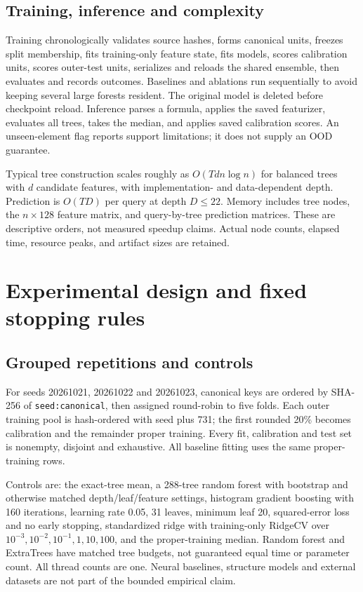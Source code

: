 \documentclass[11pt]{article}
\begin{document}
\subsection{Training, inference and complexity}
Training chronologically validates source hashes, forms canonical units, freezes split membership, fits training-only feature state, fits models, scores calibration units, scores outer-test units, serializes and reloads the shared ensemble, then evaluates and records outcomes. Baselines and ablations run sequentially to avoid keeping several large forests resident. The original model is deleted before checkpoint reload. Inference parses a formula, applies the saved featurizer, evaluates all trees, takes the median, and applies saved calibration scores. An unseen-element flag reports support limitations; it does not supply an OOD guarantee.

Typical tree construction scales roughly as $O(Tdn\log n)$ for balanced trees with $d$ candidate features, with implementation- and data-dependent depth. Prediction is $O(TD)$ per query at depth $D\leq22$. Memory includes tree nodes, the $n\times128$ feature matrix, and query-by-tree prediction matrices. These are descriptive orders, not measured speedup claims. Actual node counts, elapsed time, resource peaks, and artifact sizes are retained.

\section{Experimental design and fixed stopping rules}
\subsection{Grouped repetitions and controls}
For seeds 20261021, 20261022 and 20261023, canonical keys are ordered by SHA-256 of \texttt{seed:canonical}, then assigned round-robin to five folds. Each outer training pool is hash-ordered with seed plus 731; the first rounded 20\% becomes calibration and the remainder proper training. Every fit, calibration and test set is nonempty, disjoint and exhaustive. All baseline fitting uses the same proper-training rows.

Controls are: the exact-tree mean, a 288-tree random forest with bootstrap and otherwise matched depth/leaf/feature settings, histogram gradient boosting with 160 iterations, learning rate 0.05, 31 leaves, minimum leaf 20, squared-error loss and no early stopping, standardized ridge with training-only RidgeCV over $10^{-3},10^{-2},10^{-1},1,10,100$, and the proper-training median. Random forest and ExtraTrees have matched tree budgets, not guaranteed equal time or parameter count. All thread counts are one. Neural baselines, structure models and external datasets are not part of the bounded empirical claim.
\end{document}
